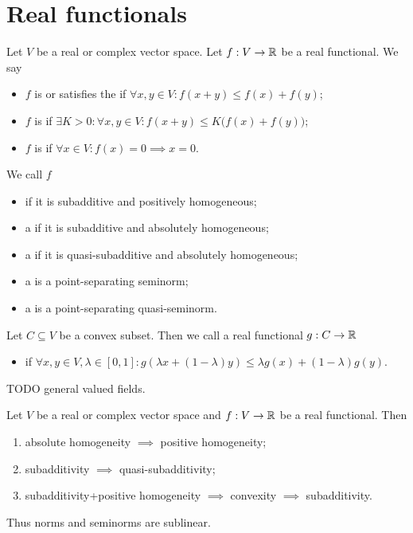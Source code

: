 \section{Real functionals}
\begin{definition}
Let $V$ be a real or complex vector space. Let $f: V\to \mathbb{R}$ be a real functional. We say
\begin{itemize}
\item $f$ is  or satisfies the  if $\forall x,y\in V: f(x+y) \leq f(x) + f(y)$;
\item $f$ is  if $\exists K>0: \forall x,y\in V: f(x+y) \leq K\big(f(x) + f(y)\big)$;
\item $f$ is  if $\forall x\in V: f(x) = 0 \implies x = 0$.
\end{itemize}
We call $f$
\begin{itemize}
\item {} if it is subadditive and positively homogeneous;
\item a  if it is subadditive and absolutely homogeneous;
\item a  if it is quasi-subadditive and absolutely homogeneous;
\item a  is a point-separating seminorm;
\item a  is a point-separating quasi-seminorm.
\end{itemize}
Let $C\subseteq V$ be a convex subset. Then we call a real functional $g: C \to \mathbb{R}$
\begin{itemize}
\item {} if $\forall x,y\in V, \lambda\in[0,1]: g(\lambda x + (1-\lambda)y) \leq \lambda g(x) + (1-\lambda)g(y)$.
\end{itemize}
\end{definition}

TODO general valued fields.

\begin{lemma}
Let $V$ be a real or complex vector space and $f: V\to \mathbb{R}$ be a real functional. Then
\begin{enumerate}
\item absolute homogeneity $\implies$ positive homogeneity;
\item subadditivity $\implies$ quasi-subadditivity;
\item subadditivity+positive homogeneity $\implies$ convexity $\implies$ subadditivity.
\end{enumerate}
\end{lemma}
Thus norms and seminorms are sublinear.

